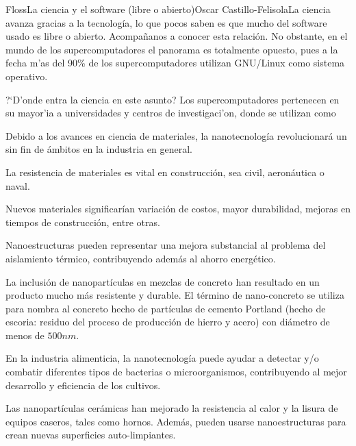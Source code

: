 \begin{Artikel}{Floss}{La ciencia y el software (libre o abierto)}{Oscar Castillo-Felisola}{La ciencia avanza gracias a la tecnolog\'ia, lo que pocos saben es que mucho del software usado es libre o abierto. Acompa\~nanos a conocer esta relaci\'on.}
No obstante, en el mundo de los supercomputadores el panorama es totalmente opuesto, pues a la fecha m'as del 90\% de los supercomputadores utilizan GNU/Linux como sistema operativo.


?`D'onde entra la ciencia en este asunto? Los supercomputadores pertenecen en su mayor'ia a universidades y centros de investigaci'on, donde se utilizan como 


Debido a los avances en ciencia de materiales, la nanotecnolog\'ia revolucionar\'a un sin fin de \'ambitos en la industria en general.

La resistencia de materiales es vital en construcci\'on, sea civil, aeron\'autica o naval. 

Nuevos materiales significar\'ian variaci\'on de costos, mayor durabilidad, mejoras en tiempos de construcci\'on, entre otras.

Nanoestructuras pueden representar una mejora substancial al problema del aislamiento t\'ermico, contribuyendo adem\'as al ahorro energ\'etico.

La inclusi\'on de nanopart\'iculas en mezclas de concreto han resultado en un producto mucho m\'as resistente y durable. El t\'ermino de nano-concreto se utiliza para nombra al concreto hecho de part\'iculas de cemento Portland (hecho de escoria: residuo del proceso de producci\'on de hierro y acero) con di\'ametro de menos de $500 n m$.


En la industria alimenticia, la nanotecnolog\'ia puede ayudar a detectar y/o combatir diferentes tipos de bacterias o microorganismos, contribuyendo al mejor desarrollo y eficiencia de los cultivos.

Las nanopart\'iculas cer\'amicas han mejorado la resistencia al calor y la lisura de equipos caseros, tales como hornos. Adem\'as, pueden usarse nanoestructuras para crean nuevas superficies auto-limpiantes.


\end{Artikel}
